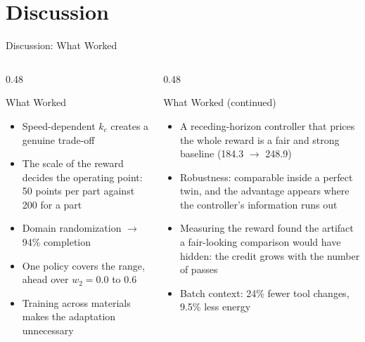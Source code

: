﻿\documentclass[11pt,aspectratio=169]{beamer}
\begin{document}
\section{Discussion}

\begin{frame}{Discussion: What Worked}
    \small
    \begin{columns}[T]
        \begin{column}{0.48\textwidth}
            \begin{block}{What Worked}
            \begin{itemize}
                \item Speed-dependent $k_c$ creates a genuine trade-off
                \item The \alert{scale of the reward} decides the operating point: 50 points per part against 200 for a part
                \item Domain randomization $\to$ 94\% completion
                \item One policy covers the range, ahead over $w_2 = 0.0$ to 0.6
                \item Training across materials makes the adaptation unnecessary
            \end{itemize}
            \end{block}
        \end{column}
        \begin{column}{0.48\textwidth}
            \begin{block}{What Worked (continued)}
            \begin{itemize}
                \item A receding-horizon controller that prices the whole reward is a fair and strong baseline (184.3 $\to$ 248.9)
                \item Robustness: comparable inside a perfect twin, and the advantage appears where the controller's information runs out
                \item Measuring the reward found the artifact a fair-looking comparison would have hidden: the credit grows with the number of passes
                \item Batch context: 24\% fewer tool changes, 9.5\% less energy
            \end{itemize}
            \end{block}
        \end{column}
    \end{columns}
\end{frame}
\end{document}
